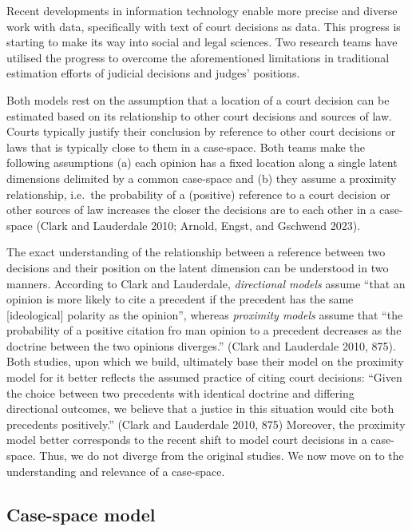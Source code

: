 \documentclass[
  11pt,
]{article}
\begin{document}
Recent developments in information technology enable more precise and
diverse work with data, specifically with text of court decisions as
data. This progress is starting to make its way into social and legal
sciences. Two research teams have utilised the progress to overcome the
aforementioned limitations in traditional estimation efforts of judicial
decisions and judges' positions.

Both models rest on the assumption that a location of a court decision
can be estimated based on its relationship to other court decisions and
sources of law. Courts typically justify their conclusion by reference
to other court decisions or laws that is typically close to them in a
case-space. Both teams make the following assumptions (a) each opinion
has a fixed location along a single latent dimensions delimited by a
common case-space and (b) they assume a proximity relationship, i.e.~the
probability of a (positive) reference to a court decision or other
sources of law increases the closer the decisions are to each other in a
case-space (Clark and Lauderdale 2010; Arnold, Engst, and Gschwend
2023).

The exact understanding of the relationship between a reference between
two decisions and their position on the latent dimension can be
understood in two manners. According to Clark and Lauderdale,
\emph{directional models} assume ``that an opinion is more likely to
cite a precedent if the precedent has the same {[}ideological{]}
polarity as the opinion'', whereas \emph{proximity models} assume that
``the probability of a positive citation fro man opinion to a precedent
decreases as the doctrine between the two opinions diverges.'' (Clark
and Lauderdale 2010, 875). Both studies, upon which we build, ultimately
base their model on the proximity model for it better reflects the
assumed practice of citing court decisions: ``Given the choice between
two precedents with identical doctrine and differing directional
outcomes, we believe that a justice in this situation would cite both
precedents positively.'' (Clark and Lauderdale 2010, 875) Moreover, the
proximity model better corresponds to the recent shift to model court
decisions in a case-space. Thus, we do not diverge from the original
studies. We now move on to the understanding and relevance of a
case-space.

\hypertarget{case-space-model}{%
\subsection{Case-space model}\label{case-space-model}}
\end{document}
